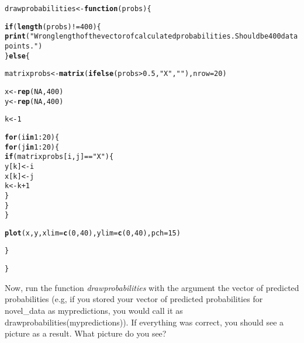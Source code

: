 \documentclass{article}\usepackage[]{graphicx}\usepackage[]{color}
\makeatletter
\newcommand{\hlnum}[1]{\textcolor[rgb]{0.686,0.059,0.569}{#1}}%
\newcommand{\hlstr}[1]{\textcolor[rgb]{0.192,0.494,0.8}{#1}}%
\newcommand{\hlopt}[1]{\textcolor[rgb]{0,0,0}{#1}}%
\newcommand{\hlstd}[1]{\textcolor[rgb]{0.345,0.345,0.345}{#1}}%
\newcommand{\hlkwa}[1]{\textcolor[rgb]{0.161,0.373,0.58}{\textbf{#1}}}%
\newcommand{\hlkwb}[1]{\textcolor[rgb]{0.69,0.353,0.396}{#1}}%
\newcommand{\hlkwc}[1]{\textcolor[rgb]{0.333,0.667,0.333}{#1}}%
\newcommand{\hlkwd}[1]{\textcolor[rgb]{0.737,0.353,0.396}{\textbf{#1}}}%
\newenvironment{kframe}{%
 \def\at@end@of@kframe{}%
 \ifinner\ifhmode%
  \def\at@end@of@kframe{\end{minipage}}%
  \begin{minipage}{\columnwidth}%
 \fi\fi%
 \def\FrameCommand##1{\hskip\@totalleftmargin \hskip-\fboxsep
 \colorbox{shadecolor}{##1}\hskip-\fboxsep
     \hskip-\linewidth \hskip-\@totalleftmargin \hskip\columnwidth}%
 \MakeFramed {\advance\hsize-\width
   \@totalleftmargin\z@ \linewidth\hsize
   \@setminipage}}%
 {\par\unskip\endMakeFramed%
 \at@end@of@kframe}
\newenvironment{knitrout}{}{} %
\makeatother
\begin{document}
\begin{knitrout}
\color{fgcolor}\begin{kframe}
\begin{alltt}
\hlstd{drawprobabilities} \hlkwb{<-} \hlkwa{function}\hlstd{(}\hlkwc{probs}\hlstd{) \{}

    \hlkwa{if} \hlstd{(}\hlkwd{length}\hlstd{(probs)} \hlopt{!=} \hlnum{400}\hlstd{) \{}
        \hlkwd{print}\hlstd{(}\hlstr{"Wrong length of the vector of calculated probabilities. Should be 400 data points."}\hlstd{)}
    \hlstd{\}} \hlkwa{else} \hlstd{\{}

        \hlstd{matrixprobs} \hlkwb{<-} \hlkwd{matrix}\hlstd{(}\hlkwd{ifelse}\hlstd{(probs} \hlopt{>} \hlnum{0.5}\hlstd{,} \hlstr{"X"}\hlstd{,} \hlstr{""}\hlstd{),} \hlkwc{nrow} \hlstd{=} \hlnum{20}\hlstd{)}

        \hlstd{x} \hlkwb{<-} \hlkwd{rep}\hlstd{(}\hlnum{NA}\hlstd{,} \hlnum{400}\hlstd{)}
        \hlstd{y} \hlkwb{<-} \hlkwd{rep}\hlstd{(}\hlnum{NA}\hlstd{,} \hlnum{400}\hlstd{)}

        \hlstd{k} \hlkwb{<-} \hlnum{1}

        \hlkwa{for} \hlstd{(i} \hlkwa{in} \hlnum{1}\hlopt{:}\hlnum{20}\hlstd{) \{}
            \hlkwa{for} \hlstd{(j} \hlkwa{in} \hlnum{1}\hlopt{:}\hlnum{20}\hlstd{) \{}
                \hlkwa{if} \hlstd{(matrixprobs[i, j]} \hlopt{==} \hlstr{"X"}\hlstd{) \{}
                  \hlstd{y[k]} \hlkwb{<-} \hlstd{i}
                  \hlstd{x[k]} \hlkwb{<-} \hlstd{j}
                  \hlstd{k} \hlkwb{<-} \hlstd{k} \hlopt{+} \hlnum{1}
                \hlstd{\}}
            \hlstd{\}}
        \hlstd{\}}

        \hlkwd{plot}\hlstd{(x, y,} \hlkwc{xlim} \hlstd{=} \hlkwd{c}\hlstd{(}\hlnum{0}\hlstd{,} \hlnum{40}\hlstd{),} \hlkwc{ylim} \hlstd{=} \hlkwd{c}\hlstd{(}\hlnum{0}\hlstd{,} \hlnum{40}\hlstd{),} \hlkwc{pch} \hlstd{=} \hlnum{15}\hlstd{)}

    \hlstd{\}}

\hlstd{\}}
\end{alltt}
\end{kframe}
\end{knitrout}

Now, run the function \textit{drawprobabilities} with the argument the vector of predicted probabilities (e.g, if you stored your vector of predicted probabilities for novel\_data as mypredictions, you would call it as drawprobabilities(mypredictions)). If everything was correct, you should see a picture as a result. What picture do you see?
\end{document}
